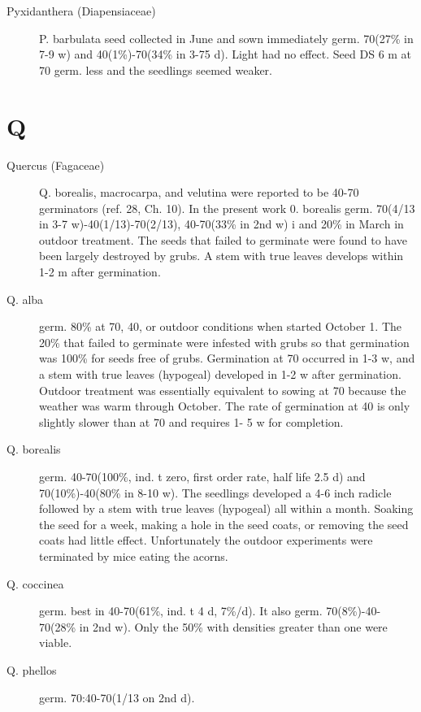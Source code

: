 \begin{description}
\item[Pyxidanthera (Diapensiaceae)] P. barbulata seed collected in June and
sown immediately germ. 70(27\% in 7-9 w) and 40(1\%)-70(34\% in 3-75 d). Light had
no effect. Seed DS 6 m at 70 germ. less and the seedlings seemed weaker.

\end{description}
\section{Q}
\begin{description}

\item[Quercus (Fagaceae)] Q. borealis, macrocarpa, and velutina were reported
to be 40-70 germinators (ref. 28, Ch. 10). In the present work 0. borealis germ.
70(4/13 in 3-7 w)-40(1/13)-70(2/13), 40-70(33\% in 2nd w) i and 20\% in March in
outdoor treatment. The seeds that failed to germinate were found to have been largely
destroyed by grubs. A stem with true leaves develops within 1-2 m after germination.

\item[Q. alba] germ. 80\% at 70, 40, or outdoor conditions when started October 1. The
20\% that failed to germinate were infested with grubs so that germination was 100\%
for seeds free of grubs. Germination at 70 occurred in 1-3 w, and a stem with true
leaves (hypogeal) developed in 1-2 w after germination. Outdoor treatment was
essentially equivalent to sowing at 70 because the weather was warm through
October. The rate of germination at 40 is only slightly slower than at 70 and requires 1-
5 w for completion.

\item[Q. borealis] germ. 40-70(100\%, ind. t zero, first order rate, half life 2.5 d) and
70(10\%)-40(80\% in 8-10 w). The seedlings developed a 4-6 inch radicle followed by
a stem with true leaves (hypogeal) all within a month. Soaking the seed for a week,
making a hole in the seed coats, or removing the seed coats had little effect.
Unfortunately the outdoor experiments were terminated by mice eating the acorns.

\item[Q. coccinea] germ. best in 40-70(61\%, ind. t 4 d, 7\%/d). It also germ. 70(8\%)-40-
70(28\% in 2nd w). Only the 50\% with densities greater than one were viable.

\item[Q. phellos] germ. 70:40-70(1/13 on 2nd d).

\end{description}
